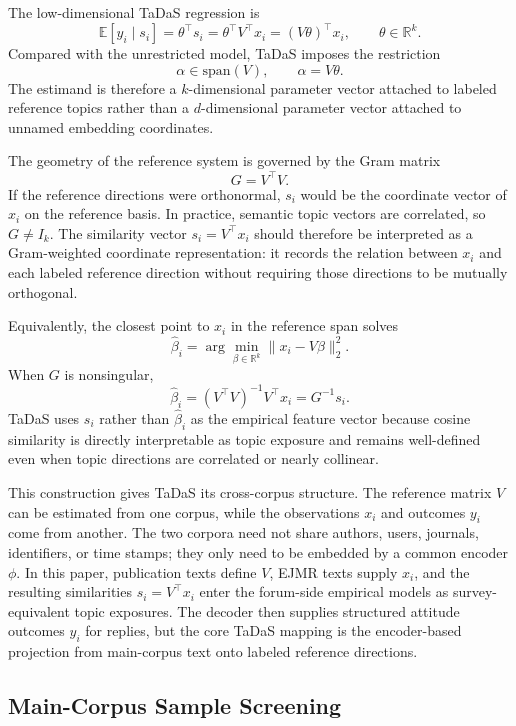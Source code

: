 \documentclass[11pt]{article}
\begin{document}
The low-dimensional TaDaS regression is
\[
\mathbb{E}[y_i\mid s_i]=\theta^\top s_i
=\theta^\top V^\top x_i
=(V\theta)^\top x_i,
\qquad
\theta\in\mathbb{R}^k .
\]
Compared with the unrestricted model, TaDaS imposes the restriction
\[
\alpha\in\mathrm{span}(V),
\qquad
\alpha=V\theta .
\]
The estimand is therefore a $k$-dimensional parameter vector attached to labeled reference topics rather than a $d$-dimensional parameter vector attached to unnamed embedding coordinates.

The geometry of the reference system is governed by the Gram matrix
\[
G=V^\top V.
\]
If the reference directions were orthonormal, $s_i$ would be the coordinate vector of $x_i$ on the reference basis. In practice, semantic topic vectors are correlated, so $G\neq I_k$. The similarity vector $s_i=V^\top x_i$ should therefore be interpreted as a Gram-weighted coordinate representation: it records the relation between $x_i$ and each labeled reference direction without requiring those directions to be mutually orthogonal.

Equivalently, the closest point to $x_i$ in the reference span solves
\[
\widehat{\beta}_i
=
\arg\min_{\beta\in\mathbb{R}^k}\|x_i-V\beta\|_2^2 .
\]
When $G$ is nonsingular,
\[
\widehat{\beta}_i=(V^\top V)^{-1}V^\top x_i=G^{-1}s_i .
\]
TaDaS uses $s_i$ rather than $\widehat{\beta}_i$ as the empirical feature vector because cosine similarity is directly interpretable as topic exposure and remains well-defined even when topic directions are correlated or nearly collinear.

This construction gives TaDaS its cross-corpus structure. The reference matrix $V$ can be estimated from one corpus, while the observations $x_i$ and outcomes $y_i$ come from another. The two corpora need not share authors, users, journals, identifiers, or time stamps; they only need to be embedded by a common encoder $\phi$. In this paper, publication texts define $V$, EJMR texts supply $x_i$, and the resulting similarities $s_i=V^\top x_i$ enter the forum-side empirical models as survey-equivalent topic exposures. The decoder then supplies structured attitude outcomes $y_i$ for replies, but the core TaDaS mapping is the encoder-based projection from main-corpus text onto labeled reference directions.

\subsection{Main-Corpus Sample Screening}
\label{app:tadas_sample_screening}
\end{document}
